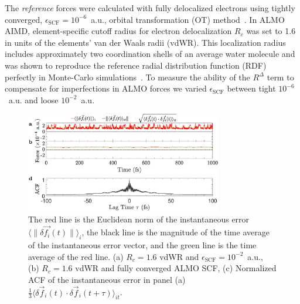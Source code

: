 \documentclass[aps,prl,reprint,amsmath,amssymb]{revtex4-1}
\begin{document}
The \emph{reference} forces were calculated with fully delocalized electrons using tightly converged, $\epsilon_{\text{SCF}}=10^{-6}$~a.u., orbital transformation (OT) method~\cite{a:ot}. 
In ALMO AIMD, element-specific cutoff radius for electron delocalization $R_c$ was set to 1.6 in units of the elements' van der Waals radii (vdWR). This localization radius includes approximately two coordination shells of an average water molecule and was shown to reproduce the reference radial distribution function (RDF) perfectly in Monte-Carlo simulations~\cite{a:almo-ls}. 
%
To measure the ability of the $R^{\Delta}$ term to compensate for imperfections in ALMO forces we varied $\epsilon_{\text{SCF}}$ between tight $10^{-6}$~a.u. and loose $10^{-2}$~a.u. 

\begin{figure}
\includegraphics[trim={0.5cm 0cm 0.7cm 0.1cm},clip,width=8.6cm]{DeltaForceComparison_with_ACF.eps}
\caption{\label{fig:randomforce}  
The red line is the Euclidean norm of the instantaneous error $\langle \| \delta \vec{f_{i}}(t) \| \rangle_{i}$, the black line is the magnitude of the time average of the instantaneous error vector, and the green line is the time average of the red line. 
(a) $R_{c} = 1.6$ vdWR and $\epsilon_{\text{SCF}} = 10^{-2}$~a.u., 
(b) $R_{c} = 1.6$ vdWR and fully converged ALMO SCF, 
(c) Normalized ACF of the instantaneous error in panel (a) $\frac{1}{3}\langle \delta \vec{f}_i (t) \cdot \delta\vec{f}_i(t+\tau) \rangle_{it} $.
}
\end{figure}
\end{document}
